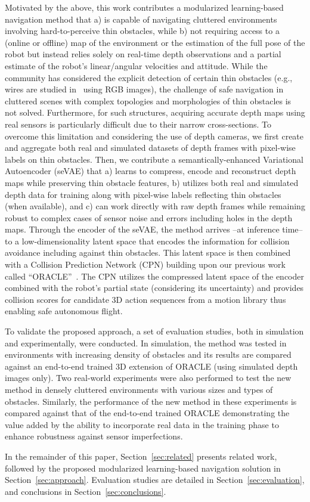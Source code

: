 Motivated by the above, this work contributes a modularized learning-based navigation method that a) is capable of navigating cluttered environments involving hard-to-perceive thin obstacles, while b) not requiring access to a (online or offline) map of the environment or the estimation of the full pose of the robot but instead relies solely on real-time depth observations and a partial estimate of the robot's linear/angular velocities and attitude. While the community has considered the explicit detection of certain thin obstacles (e.g., wires are studied in~\cite{Madaan2017WireDU,Kulkarni2020} using RGB images), the challenge of safe navigation in cluttered scenes with complex topologies and morphologies of thin obstacles is not solved. Furthermore, for such structures, acquiring accurate depth maps using real sensors is particularly difficult due to their narrow cross-sections. To overcome this limitation and considering the use of depth cameras, we first create and aggregate both real and simulated datasets of depth frames with pixel-wise labels on thin obstacles. Then, we contribute a semantically-enhanced Variational Autoencoder (seVAE) that a) learns to compress, encode and reconstruct depth maps while preserving thin obstacle features, b) utilizes both real and simulated depth data for training along with pixel-wise labels reflecting thin obstacles (when available), and c) can work directly with raw depth frames while remaining robust to complex cases of sensor noise and errors including holes in the depth maps. Through the encoder of the seVAE, the method arrives --at inference time-- to a low-dimensionality latent space that encodes the information for collision avoidance including against thin obstacles. This latent space is then combined with a Collision Prediction Network (CPN) building upon our previous work called ``ORACLE''~\cite{ORACLE_ICRA2022}. The CPN utilizes the compressed latent space of the encoder combined with the robot's partial state (considering its uncertainty) and provides collision scores for candidate $3\textrm{D}$ action sequences from a motion library thus enabling safe autonomous flight. 


To validate the proposed approach, a set of evaluation studies, both in simulation and experimentally, were conducted. In simulation, the method was tested in environments with increasing density of obstacles and its results are compared against an end-to-end trained $3\textrm{D}$ extension of ORACLE (using simulated depth images only). Two real-world experiments were also performed to test the new method in densely cluttered environments with various sizes and types of obstacles. Similarly, the performance of the new method in these experiments is compared against that of the end-to-end trained ORACLE demonstrating the value added by the ability to incorporate real data in the training phase to enhance robustness against sensor imperfections.



In the remainder of this paper, Section~\ref{sec:related} presents related work, followed by the proposed modularized learning-based navigation solution in Section~\ref{sec:approach}. Evaluation studies are detailed in Section~\ref{sec:evaluation}, and conclusions in Section~\ref{sec:conclusions}.


